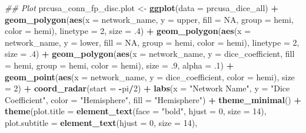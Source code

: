 \documentclass[
]{article}
\newenvironment{Shaded}{\begin{snugshade}}{\end{snugshade}}
\newcommand{\CommentTok}[1]{\textcolor[rgb]{0.56,0.35,0.01}{\textit{#1}}}
\newcommand{\DataTypeTok}[1]{\textcolor[rgb]{0.13,0.29,0.53}{#1}}
\newcommand{\DecValTok}[1]{\textcolor[rgb]{0.00,0.00,0.81}{#1}}
\newcommand{\FloatTok}[1]{\textcolor[rgb]{0.00,0.00,0.81}{#1}}
\newcommand{\KeywordTok}[1]{\textcolor[rgb]{0.13,0.29,0.53}{\textbf{#1}}}
\newcommand{\NormalTok}[1]{#1}
\newcommand{\OperatorTok}[1]{\textcolor[rgb]{0.81,0.36,0.00}{\textbf{#1}}}
\newcommand{\OtherTok}[1]{\textcolor[rgb]{0.56,0.35,0.01}{#1}}
\newcommand{\StringTok}[1]{\textcolor[rgb]{0.31,0.60,0.02}{#1}}
\begin{document}
\begin{Shaded}
\begin{Highlighting}[]
{{\CommentTok{## Plot}
\NormalTok{prcusa_conn_fp_disc.plot <-}\StringTok{ }\KeywordTok{ggplot}\NormalTok{(}\DataTypeTok{data =}\NormalTok{ prcusa_dice_all) }\OperatorTok{+}\StringTok{  }
\StringTok{  }\KeywordTok{geom_polygon}\NormalTok{(}\KeywordTok{aes}\NormalTok{(}\DataTypeTok{x =}\NormalTok{ network_name, }\DataTypeTok{y =}\NormalTok{ upper, }\DataTypeTok{fill =} \OtherTok{NA}\NormalTok{, }\DataTypeTok{group =}\NormalTok{ hemi, }\DataTypeTok{color =}\NormalTok{ hemi), }
              \DataTypeTok{linetype =} \DecValTok{2}\NormalTok{, }\DataTypeTok{size =} \FloatTok{.4}\NormalTok{) }\OperatorTok{+}\StringTok{ }
\StringTok{  }\KeywordTok{geom_polygon}\NormalTok{(}\KeywordTok{aes}\NormalTok{(}\DataTypeTok{x =}\NormalTok{ network_name, }\DataTypeTok{y =}\NormalTok{ lower, }\DataTypeTok{fill =} \OtherTok{NA}\NormalTok{, }\DataTypeTok{group =}\NormalTok{ hemi, }\DataTypeTok{color =}\NormalTok{ hemi), }
              \DataTypeTok{linetype =} \DecValTok{2}\NormalTok{, }\DataTypeTok{size =} \FloatTok{.4}\NormalTok{) }\OperatorTok{+}
\StringTok{  }\KeywordTok{geom_polygon}\NormalTok{(}\KeywordTok{aes}\NormalTok{(}\DataTypeTok{x =}\NormalTok{ network_name, }\DataTypeTok{y =}\NormalTok{ dice_coefficient, }\DataTypeTok{fill =}\NormalTok{ hemi, }\DataTypeTok{group =}\NormalTok{ hemi, }\DataTypeTok{color =}\NormalTok{ hemi), }
               \DataTypeTok{size =} \FloatTok{.9}\NormalTok{, }\DataTypeTok{alpha =} \FloatTok{.1}\NormalTok{) }\OperatorTok{+}
\StringTok{  }\KeywordTok{geom_point}\NormalTok{(}\KeywordTok{aes}\NormalTok{(}\DataTypeTok{x =}\NormalTok{ network_name, }\DataTypeTok{y =}\NormalTok{ dice_coefficient, }\DataTypeTok{color =}\NormalTok{ hemi), }\DataTypeTok{size =} \DecValTok{2}\NormalTok{) }\OperatorTok{+}\StringTok{ }
\StringTok{  }\KeywordTok{coord_radar}\NormalTok{(}\DataTypeTok{start =} \OperatorTok{-}\NormalTok{pi}\OperatorTok{/}\DecValTok{2}\NormalTok{) }\OperatorTok{+}
\StringTok{  }\KeywordTok{labs}\NormalTok{(}\DataTypeTok{x =} \StringTok{"Network Name"}\NormalTok{,}
       \DataTypeTok{y =} \StringTok{"Dice Coefficient"}\NormalTok{,}
       \DataTypeTok{color =} \StringTok{"Hemisphere"}\NormalTok{,}
       \DataTypeTok{fill =} \StringTok{"Hemisphere"}\NormalTok{) }\OperatorTok{+}\StringTok{  }
\StringTok{    }\KeywordTok{theme_minimal}\NormalTok{() }\OperatorTok{+}
\StringTok{  }\KeywordTok{theme}\NormalTok{(}\DataTypeTok{plot.title =} \KeywordTok{element_text}\NormalTok{(}\DataTypeTok{face =} \StringTok{"bold"}\NormalTok{, }\DataTypeTok{hjust =} \DecValTok{0}\NormalTok{, }\DataTypeTok{size =} \DecValTok{14}\NormalTok{), }
        \DataTypeTok{plot.subtitle =} \KeywordTok{element_text}\NormalTok{(}\DataTypeTok{hjust =} \DecValTok{0}\NormalTok{, }\DataTypeTok{size =} \DecValTok{14}\NormalTok{),}
}}
\end{Highlighting}
\end{Shaded}
\end{document}

